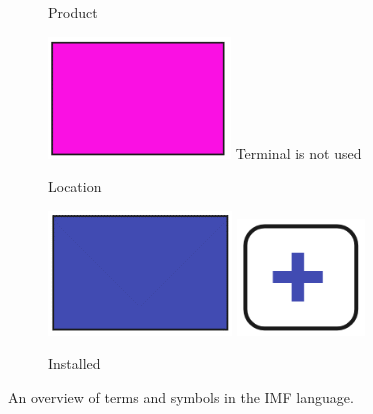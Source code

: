 \documentclass[../main.tex]{subfiles}
\begin{document}
\begin{figure}
\begin{subfigure}[t]{0.2\textwidth}
    \caption{Product}
  \end{subfigure}
  \hfill
  \begin{subfigure}[t]{0.2\textwidth}\centering
    \includegraphics[width=.8\textwidth]{img/IMFmanual-img022.png}
    Terminal is not used\\[1.7ex]
    \caption{Location}
  \end{subfigure}
  \hfill
  \begin{subfigure}[t]{0.2\textwidth}\centering
    \includegraphics[width=.8\textwidth]{img/IMFmanual-img023.png}
    \includegraphics[width=.25\textwidth]{img/IMFmanual-img026.png}
    \caption{Installed}
  \end{subfigure}

  \vspace{1cm}
  \caption{An overview of terms and symbols in the IMF language.}
  \label{tab:Table 3}
\end{figure}
\end{document}
